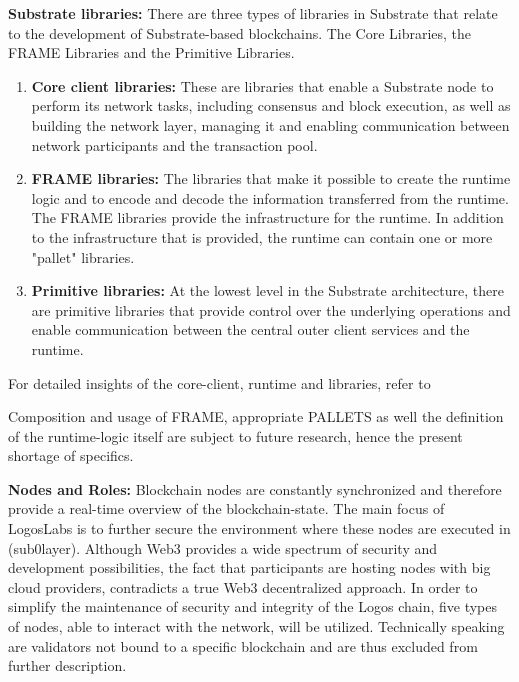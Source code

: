 \documentclass[]{article}
\begin{document}
\textbf{Substrate libraries:}
There are three types of libraries in Substrate that relate to the development of Substrate-based blockchains.
The Core Libraries, the FRAME Libraries and the Primitive Libraries.  

\begin{enumerate}[label=\textbullet]
	\item\textbf{Core client libraries:}
    These are libraries that enable a Substrate node to perform its network tasks, including consensus and block execution, as well as building the network layer, managing it and enabling communication between network participants and the transaction pool. 
	
	\item\textbf{FRAME libraries:} 
    The libraries that make it possible to create the runtime logic and to encode and decode the information transferred from the runtime.
    The FRAME libraries provide the infrastructure for the runtime.
    In addition to the infrastructure that is provided, the runtime can contain one or more "pallet" libraries.    
	
	\item\textbf{Primitive libraries:} 
	At the lowest level in the Substrate architecture, there are primitive libraries that provide control over the underlying operations and enable communication between the central outer client services and the runtime.	
\end{enumerate}
For detailed insights of the core-client, runtime and libraries, refer to \cite{SubstrateDoc-arch}

Composition and usage of FRAME, appropriate PALLETS as well the definition of the runtime-logic itself are subject to future research, hence the present shortage of specifics.
\newline

\textbf{Nodes and Roles:}
Blockchain nodes are constantly synchronized and therefore provide a real-time overview of the blockchain-state.
The main focus of LogosLabs is to further secure the environment where these nodes are executed in (sub0layer).
Although Web3 provides a wide spectrum of security and development possibilities, the fact that participants are hosting nodes with big cloud providers, contradicts a true Web3 decentralized approach. 
In order to simplify the maintenance of security and integrity of the Logos chain, five types of nodes, able to interact with the network, will be utilized. 
Technically speaking are validators \cite{PolkadotDoc-validator} not bound to a specific blockchain and are thus excluded from further description. 
\end{document}
